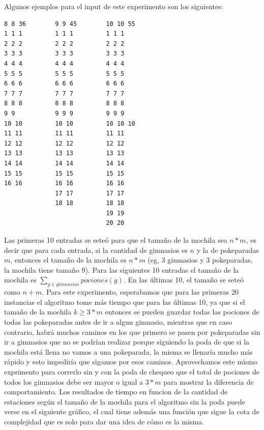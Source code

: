       Algunos ejemplos para el input de este experimento son los siguientes:


      \begin{codesnippet}
\begin{verbatim}
8 8 36        9 9 45        10 10 55
1 1 1         1 1 1         1 1 1
2 2 2         2 2 2         2 2 2
3 3 3         3 3 3         3 3 3
4 4 4         4 4 4         4 4 4
5 5 5         5 5 5         5 5 5
6 6 6         6 6 6         6 6 6
7 7 7         7 7 7         7 7 7
8 8 8         8 8 8         8 8 8
9 9           9 9 9         9 9 9
10 10         10 10         10 10 10
11 11         11 11         11 11
12 12         12 12         12 12
13 13         13 13         13 13
14 14         14 14         14 14
15 15         15 15         15 15
16 16         16 16         16 16
              17 17         17 17
              18 18         18 18
                            19 19
                            20 20

\end{verbatim}
      \end{codesnippet}

      Las primeras 10 entradas se seteó para que el tamaño de la mochila sea $n*m$, es decir que para cada entrada, si la cantidad de gimnasios es $n$ y la de pokeparadas $m$, entonces el tamaño de la mochila es $n*m$ (eg, 3 gimnasios y 3 pokeparadas, la mochila tiene tamaño 9). Para las siguientes 10 entradas el tamaño de la mochila es $\sum_{g \in gimnasios} pociones(g)$. En las últimas 10, el tamaño se seteó como $n+m$. 
      Para este experimento, esperabamos que para las primeras 20 instancias el algoritmo tome más tiempo que para las últimas 10, ya que si el tamaño de la mochila $k \geq 3*m$ entonces se pueden guardar todas las pociones de todas las pokeparadas antes de ir a algun gimnasio, mientras que en caso contrario, habrá muchos caminos en los que primero se pasen por pokeparadas sin ir a gimnasios que no se podrían realizar porque siguiendo la poda de que si la mochila está llena no vamos a una pokeparada, la misma se llenaría mucho más rápido y esto impediría que sigamos por esos caminos.
      Aprovechamos este mismo exprimento para correrlo sin y con la poda de chequeo que el total de pociones de todos los gimnasios debe ser mayor o igual a $3*m$ para mostrar la diferencia de comportamiento.
      Los resultados de tiempo en funcion de la cantidad de estaciones según el tamaño de la mochila para el algoritmo sin la poda puede verse en el siguiente gráfico, el cual tiene además una función que sigue la cota de complejidad que es solo para dar una idea de cómo es la misma.

